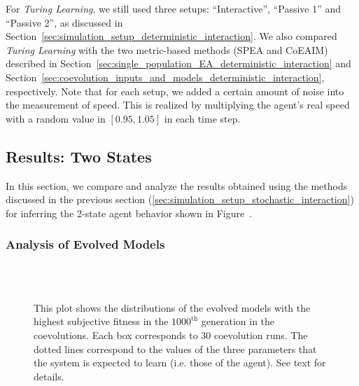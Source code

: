 For \textit{Turing Learning}, we still used three setups: ``Interactive'', ``Passive 1'' and ``Passive 2'', as discussed in Section~\ref{sec:simulation_setup_deterministic_interaction}. We also compared \textit{Turing Learning} with the two metric-based methods (SPEA and CoEAIM) described in Section~\ref{sec:single_population_EA_deterministic_interaction} and Section~\ref{sec:coevolution_inputs_and_models_deterministic_interaction}, respectively. Note that for each setup, we added a certain amount of noise into the measurement of speed. This is realized by multiplying the agent's real speed with a random value in $[0.95, 1.05]$ in each time step. 

\subsection{Results: Two States}\label{sec:results_interaction_stochastic_2states}

In this section, we compare and analyze the results obtained using the methods discussed in the previous section (\ref{sec:simulation_setup_stochastic_interaction}) for inferring the 2-state agent behavior shown in Figure~.

\subsubsection{Analysis of Evolved Models}
\begin{figure}[!t]%
	\centering
		\\
		\\
		\caption{This plot shows the distributions of the evolved models with the highest subjective fitness in the $1000^\textrm{th}$ generation in the coevolutions. Each box corresponds to $30$ coevolution runs. The dotted lines correspond to the values of the three parameters that the system is expected to learn (i.e. those of the agent). See text for details.\label{fig:parameters_box_stochastic_two states}}
\end{figure}

